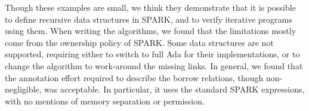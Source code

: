 \documentclass[runningheads]{llncs}
\begin{document}
Though these examples are small, we think they demonstrate that it is possible to define recursive data structures in SPARK, and to verify iterative programs using them. When writing the algorithms, we found that the limitations mostly come from the ownership policy of SPARK. Some data structures are not supported, requiring either to switch to full Ada for their implementations, or to change the algorithm to work-around the missing links. %
%
%
In general, we found that the annotation effort required to describe the borrow relations, though non-negligible, was acceptable.
In particular, it uses the standard SPARK expressions, with no mentions of memory separation or permission.
\end{document}
